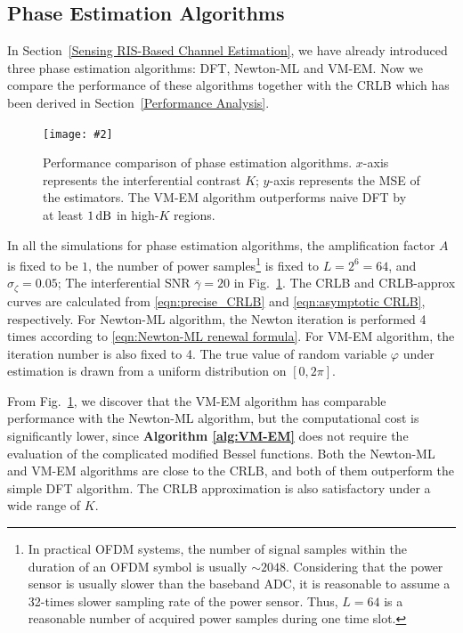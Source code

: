 \documentclass[conference,10pt,twocolumn]{IEEEtran}
\theoremstyle{nonumberplain}
\newcommand{\myincludegraphics}[2][width=8.5cm]{\texttt{[image: \#2]}}
\begin{document}
\subsection{Phase Estimation Algorithms} \label{Phase Estimation Algorithms}
    In Section~\ref{Sensing RIS-Based Channel Estimation}, we have already introduced three phase estimation algorithms: DFT, Newton-ML and VM-EM. Now we compare the performance of these algorithms together with the CRLB which has been derived in Section~\ref{Performance Analysis}. 
    \begin{figure}[!t]
        \centering
        \myincludegraphics{data/pe_K-ML.pdf}
        \caption{Performance comparison of phase estimation algorithms. $x$-axis represents the interferential contrast $K$; $y$-axis represents the MSE of the estimators. The VM-EM algorithm outperforms naive DFT by at least $1\,{\rm dB}$ in high-$K$ regions. }
        \label{fig:phase estimation_K}
    \end{figure}
    In all the simulations for phase estimation algorithms, the amplification factor $A$ is fixed to be $1$, the number of power samples\footnote{In practical OFDM systems, the number of signal samples within the duration of an OFDM symbol is usually $\sim 2048$. Considering that the power sensor is usually slower than the baseband ADC, it is reasonable to assume a 32-times slower sampling rate of the power sensor. Thus, $L=64$ is a reasonable number of acquired power samples during one time slot.} is fixed to $L=2^6=64$, and $\sigma_\zeta=0.05$; 
    The interferential SNR $\bar{\gamma}=20$ in Fig.~\ref{fig:phase estimation_K}. 
    The CRLB and CRLB-approx curves are calculated from \eqref{eqn:precise_CRLB} and \eqref{eqn:asymptotic CRLB}, respectively. 
    For Newton-ML algorithm, the Newton iteration is performed 4 times according to \eqref{eqn:Newton-ML renewal formula}. 
    For VM-EM algorithm, the iteration number is also fixed to 4. The true value of random variable $\varphi$ under estimation is drawn from a uniform distribution on $[0,2\pi]$. 

    From Fig.~\ref{fig:phase estimation_K}, we discover that the VM-EM algorithm has comparable performance with the Newton-ML algorithm, but the computational cost is significantly lower, since {\bf Algorithm \ref{alg:VM-EM}} does not require the evaluation of the complicated modified Bessel functions. 
    Both the Newton-ML and VM-EM algorithms are close to the CRLB, and both of them outperform the simple DFT algorithm. 
    The CRLB approximation is also satisfactory under a wide range of $K$. 
\end{document}
